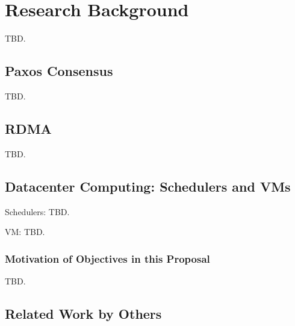 \vspace{-.15in}\section{Research Background} \label{sec:related}\vspace{-.075in}

TBD.

\vspace{-.15in}\subsection{Paxos Consensus} 
\label{sec:background}\vspace{-.075in}

TBD.

\vspace{-.15in}\subsection{RDMA} 
\label{sec:background}\vspace{-.075in}

TBD.

\vspace{-.15in}\subsection{Datacenter Computing: Schedulers and VMs} 
\label{sec:background}\vspace{-.075in}

Schedulers: TBD.

VM: TBD.


\vspace{-.15in}\subsubsection{Motivation of Objectives in this Proposal} 
\label{sec:out-study}\vspace{-.075in}

TBD.

\vspace{-.15in}\subsection{Related Work by Others} 
\label{sec:others-work}\vspace{-.075in}


